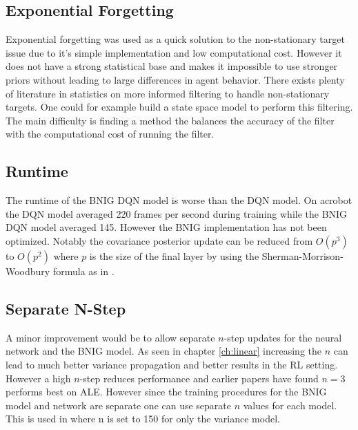 \subsection{Exponential Forgetting}

Exponential forgetting was used as a quick solution to the non-stationary target issue due to it's simple implementation and low computational cost. However it does not have a strong statistical base and makes it impossible to use stronger priors without leading to large differences in agent behavior. There exists plenty of literature in statistics on more informed filtering to handle non-stationary targets. One could for example build a state space model to perform this filtering. The main difficulty is finding a method the balances the accuracy of the filter with the computational cost of running the filter.

\subsection{Runtime}

The runtime of the BNIG DQN model is worse than the DQN model. On acrobot the DQN model averaged 220 frames per second during training while the BNIG DQN model averaged 145. However the BNIG implementation has not been optimized. Notably the covariance posterior update can be reduced from $O(p^3)$ to $O(p^2)$ where $p$ is the size of the final layer by using the Sherman-Morrison-Woodbury formula as in \cite{donoghue_2017}. 

\subsection{Separate N-Step}

A minor improvement would be to allow separate $n$-step updates for the neural network and the BNIG model. As seen in chapter \ref{ch:linear} increasing the $n$ can lead to much better variance propagation and better results in the RL setting. However a high $n$-step reduces performance and earlier papers have found $n=3$ performs best on ALE\citep{hessel_2017}. However since the training procedures for the BNIG model and network are separate one can use separate $n$ values for each model. This is used in \cite{donoghue_2017} where n is set to 150 for only the variance model.

\cleardoublepage